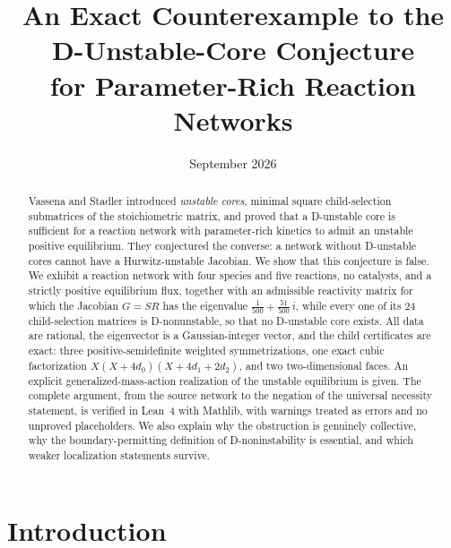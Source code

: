 \documentclass[11pt,a4paper]{article}
\title{An Exact Counterexample to the D-Unstable-Core Conjecture\\for Parameter-Rich Reaction Networks}
\author{}
\date{September 2026}
\theoremstyle{definition}
\theoremstyle{remark}
\begin{document}
\maketitle

\begin{abstract}
Vassena and Stadler introduced \emph{unstable cores}, minimal square child-selection submatrices of the stoichiometric matrix, and proved that a D-unstable core is sufficient for a reaction network with parameter-rich kinetics to admit an unstable positive equilibrium. They conjectured the converse: a network without D-unstable cores cannot have a Hurwitz-unstable Jacobian. We show that this conjecture is false. We exhibit a reaction network with four species and five reactions, no catalysts, and a strictly positive equilibrium flux, together with an admissible reactivity matrix for which the Jacobian $G=SR$ has the eigenvalue $\tfrac{1}{500}+\tfrac{51}{500}\,i$, while every one of its $24$ child-selection matrices is D-nonunstable, so that no D-unstable core exists. All data are rational, the eigenvector is a Gaussian-integer vector, and the child certificates are exact: three positive-semidefinite weighted symmetrizations, one exact cubic factorization $X(X+4d_0)(X+4d_1+2d_2)$, and two two-dimensional faces. An explicit generalized-mass-action realization of the unstable equilibrium is given. The complete argument, from the source network to the negation of the universal necessity statement, is verified in Lean~4 with Mathlib, with warnings treated as errors and no unproved placeholders. We also explain why the obstruction is genuinely collective, why the boundary-permitting definition of D-noninstability is essential, and which weaker localization statements survive.
\end{abstract}

\section{Introduction}\label{sec:intro}
\end{document}
